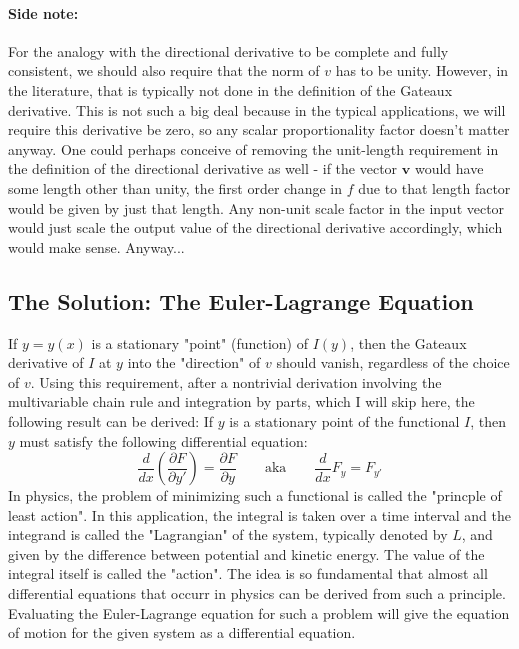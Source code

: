 \paragraph{Side note:} For the analogy with the directional derivative to be complete and fully consistent, we should also require that the norm of $v$ has to be unity. However, in the literature, that is typically not done in the definition of the Gateaux derivative. This is not such a big deal because in the typical applications, we will require this derivative be zero, so any scalar proportionality factor doesn't matter anyway. One could perhaps conceive of removing the unit-length requirement in the definition of the directional derivative as well - if the vector $\mathbf{v}$ would have some length other than unity, the first order change in $f$ due to that length factor would be given by just that length. Any non-unit scale factor in the input vector would just scale the output value of the directional derivative accordingly, which would make sense. Anyway...




\subsection{The Solution: The Euler-Lagrange Equation}
If $y = y(x)$ is a stationary "point" (function) of $I(y)$, then the Gateaux derivative of $I$ at $y$ into the "direction" of $v$ should vanish, regardless of the choice of $v$. Using this requirement, after a nontrivial derivation involving the multivariable chain rule and integration by parts, which I will skip here, the following result can be derived: If $y$ is a stationary point of the functional $I$, then $y$ must satisfy the following differential equation:
\begin{equation}
 \frac{d}{d x} \left(  \frac{\partial F}{\partial y'}  \right) = \frac{\partial F}{\partial y}
 \qquad \text{aka} \qquad
 \frac{d}{d x} F_y = F_{y'}
\end{equation}
In physics, the problem of minimizing such a functional is called the "princple of least action". In this application, the integral is taken over a time interval and the integrand is called the "Lagrangian" of the system, typically denoted by $L$, and given by the difference between potential and kinetic energy. The value of the integral itself is called the "action". The idea is so fundamental that almost all differential equations that occurr in physics can be derived from such a principle. Evaluating the Euler-Lagrange equation for such a problem will give the equation of motion for the given system as a differential equation.

